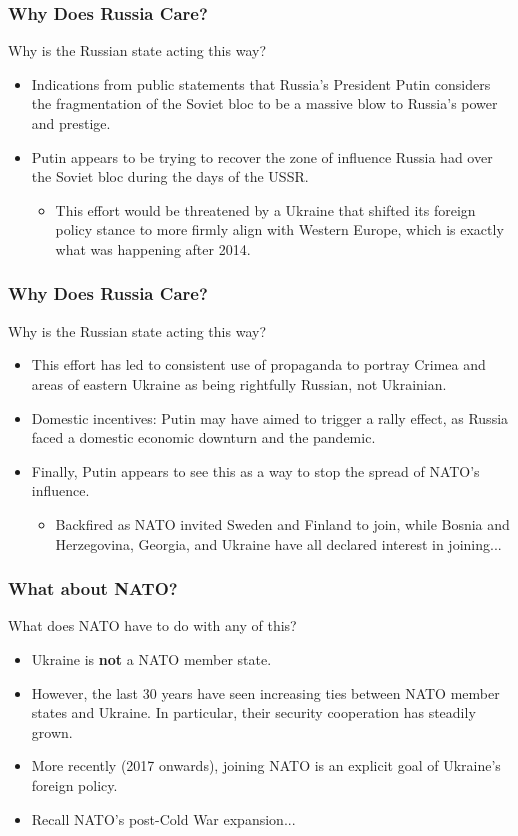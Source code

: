 \documentclass{beamer}
\begin{document}
\begin{frame} 
	\frametitle{\LARGE{Why Does Russia Care?}}
	Why is the Russian state acting this way?
	\begin{itemize}
		\item Indications from public statements that Russia's President Putin considers the fragmentation of the Soviet bloc to be a massive blow to Russia's power and prestige. \pause
		\item Putin appears to be trying to recover the zone of influence Russia had over the Soviet bloc during the days of the USSR. \pause
		\begin{itemize}
			\item This effort would be threatened by a Ukraine that shifted its foreign policy stance to more firmly align with Western Europe, which is exactly what was happening after 2014.
		\end{itemize}
	\end{itemize}
\end{frame}

\begin{frame} 
	\frametitle{\LARGE{Why Does Russia Care?}}
	Why is the Russian state acting this way?
	\begin{itemize}
		\item This effort has led to consistent use of propaganda to portray Crimea and areas of eastern Ukraine as being rightfully Russian, not Ukrainian. \pause
		\item Domestic incentives: Putin may have aimed to trigger a rally effect, as Russia faced a domestic economic downturn and the pandemic. \pause
		\item Finally, Putin appears to see this as a way to stop the spread of NATO's influence. \pause
		\begin{itemize}
			\item Backfired as NATO invited Sweden and Finland to join, while Bosnia and Herzegovina, Georgia, and Ukraine have all declared interest in joining...
		\end{itemize}
	\end{itemize}
\end{frame}

\begin{frame} 
	\frametitle{\LARGE{What about NATO?}}
	What does NATO have to do with any of this?
	\begin{itemize}
		\item Ukraine is \textbf{not} a NATO member state. \pause
		\item However, the last 30 years have seen increasing ties between NATO member states and Ukraine. In particular, their security cooperation has steadily grown. \pause
		\item More recently (2017 onwards), joining NATO is an explicit goal of Ukraine's foreign policy.
		\item Recall NATO's post-Cold War expansion...
	\end{itemize}
\end{frame}
\end{document}
